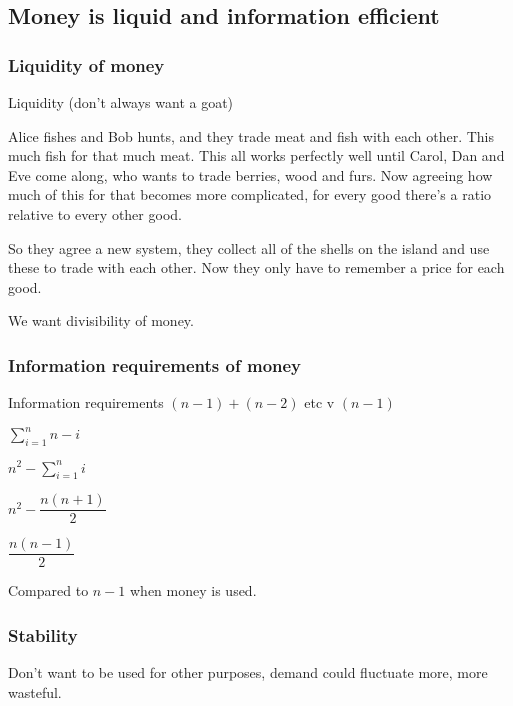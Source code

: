 
\subsection{Money is liquid and information efficient}

\subsubsection{Liquidity of money}

Liquidity (don’t always want a goat)

Alice fishes and Bob hunts, and they trade meat and fish with each other. This much fish for that much meat. This all works perfectly well until Carol, Dan and Eve come along, who wants to trade berries, wood and furs. Now agreeing how much of this for that becomes more complicated, for every good there’s a ratio relative to every other good.

So they agree a new system, they collect all of the shells on the island and use these to trade with each other. Now they only have to remember a price for each good.

We want divisibility of money.

\subsubsection{Information requirements of money}

Information requirements \((n-1)+(n-2)\) etc v \((n-1)\)

\(\sum_{i=1}^n n-i\)

\(n^2-\sum_{i=1}^n i\)

\(n^2-\dfrac{n(n+1)}{2}\)

\(\dfrac{n(n-1)}{2}\)

Compared to \(n-1\) when money is used.

\subsubsection{Stability}

Don't want to be used for other purposes, demand could fluctuate more, more wasteful.

